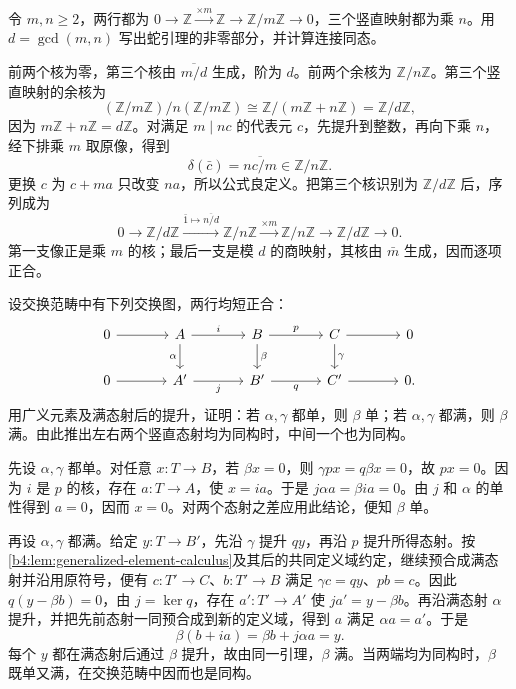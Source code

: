 \begin{exercise}\label{b4:ex:04-snake-integers}
	令 \(m,n\geq2\)，两行都为 \(0\to\mathbb Z\xrightarrow{\times m}\mathbb Z\to\mathbb Z/m\mathbb Z\to0\)，三个竖直映射都为乘 \(n\)。用 \(d=\gcd(m,n)\) 写出蛇引理的非零部分，并计算连接同态。
\end{exercise}
\begin{solution}
	前两个核为零，第三个核由 \(\overline{m/d}\) 生成，阶为 \(d\)。前两个余核为 \(\mathbb Z/n\mathbb Z\)。第三个竖直映射的余核为
	\[
		(\mathbb Z/m\mathbb Z)/n(\mathbb Z/m\mathbb Z) \cong\mathbb Z/(m\mathbb Z+n\mathbb Z) =\mathbb Z/d\mathbb Z,
	\]
	因为 \(m\mathbb Z+n\mathbb Z=d\mathbb Z\)。对满足 \(m\mid nc\) 的代表元 \(c\)，先提升到整数，再向下乘 \(n\)，经下排乘 \(m\) 取原像，得到
	\[
		\delta(\bar c)=\overline{nc/m}\in\mathbb Z/n\mathbb Z.
	\]
	更换 \(c\) 为 \(c+ma\) 只改变 \(na\)，所以公式良定义。把第三个核识别为 \(\mathbb Z/d\mathbb Z\) 后，序列成为
	\[
		0\to\mathbb Z/d\mathbb Z\xrightarrow{\bar1\mapsto\overline{n/d}} \mathbb Z/n\mathbb Z\xrightarrow{\times m}\mathbb Z/n\mathbb Z \longrightarrow\mathbb Z/d\mathbb Z\to0.
	\]
	第一支像正是乘 \(m\) 的核；最后一支是模 \(d\) 的商映射，其核由 \(\bar m\) 生成，因而逐项正合。
\end{solution}

\begin{exercise}\label{b4:ex:04-short-five}
	设交换范畴中有下列交换图，两行均短正合：
	\[
		\begin{tikzcd}[column sep=large]
			0\arrow[r]&A\arrow[r,"i"]\arrow[d,"\alpha"']&B\arrow[r,"p"]\arrow[d,"\beta"]&C\arrow[r]\arrow[d,"\gamma"]&0\\
			0\arrow[r]&A'\arrow[r,"j"']&B'\arrow[r,"q"']&C'\arrow[r]&0.
		\end{tikzcd}
	\]
	用广义元素及满态射后的提升，证明：若 \(\alpha,\gamma\) 都单，则 \(\beta\) 单；若 \(\alpha,\gamma\) 都满，则 \(\beta\) 满。由此推出左右两个竖直态射均为同构时，中间一个也为同构。
\end{exercise}
\begin{solution}
	先设 \(\alpha,\gamma\) 都单。对任意 \(x:T\to B\)，若 \(\beta x=0\)，则 \(\gamma px=q\beta x=0\)，故 \(px=0\)。因为 \(i\) 是 \(p\) 的核，存在 \(a:T\to A\)，使 \(x=ia\)。于是 \(j\alpha a=\beta ia=0\)。由 \(j\) 和 \(\alpha\) 的单性得到 \(a=0\)，因而 \(x=0\)。对两个态射之差应用此结论，便知 \(\beta\) 单。

	再设 \(\alpha,\gamma\) 都满。给定 \(y:T\to B'\)，先沿 \(\gamma\) 提升 \(qy\)，再沿 \(p\) 提升所得态射。按\cref{b4:lem:generalized-element-calculus}及其后的共同定义域约定，继续预合成满态射并沿用原符号，便有 \(c:T'\to C\)、\(b:T'\to B\) 满足 \(\gamma c=qy\)、\(pb=c\)。因此 \(q(y-\beta b)=0\)，由 \(j=\ker q\)，存在 \(a':T'\to A'\) 使 \(ja'=y-\beta b\)。再沿满态射 \(\alpha\) 提升，并把先前态射一同预合成到新的定义域，得到 \(a\) 满足 \(\alpha a=a'\)。于是
	\[
		\beta(b+ia)=\beta b+j\alpha a=y.
	\]
	每个 \(y\) 都在满态射后通过 \(\beta\) 提升，故由同一引理，\(\beta\) 满。当两端均为同构时，\(\beta\) 既单又满，在交换范畴中因而也是同构。
\end{solution}

